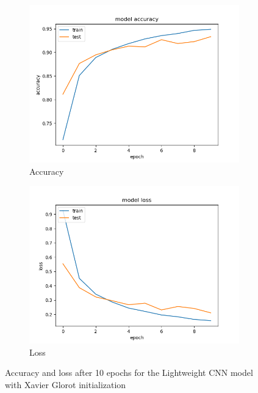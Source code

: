 \documentclass{article}
\theoremstyle{definition}
\theoremstyle{remark}
\begin{document}
\begin{figure}[h!]
\centering
\begin{subfigure}{.5\textwidth}
  \centering
  \includegraphics[width=1.2\linewidth]{img/baseline_models/leightweight_cnn_acc.png}
  \caption{Accuracy}
  \label{fig:sub1}
\end{subfigure}%
\begin{subfigure}{.5\textwidth}
  \centering
  \includegraphics[width=1.2\linewidth]{img/baseline_models/leightweight_cnn_loss.png}
  \caption{Loss}
  \label{fig:sub2}
\end{subfigure}
\caption{Accuracy and loss after 10 epochs for the Lightweight CNN model with Xavier Glorot initialization}
\label{fig:lightweight_cnn_ten_epochs}
\end{figure}
\end{document}
